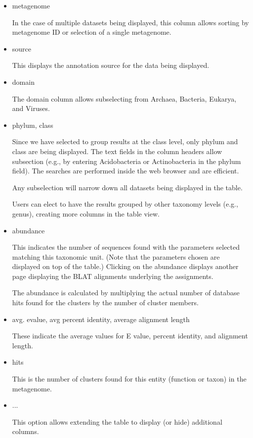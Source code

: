 \documentclass[12pt,fullpage]{report}
\begin{document}
\begin{itemize}
\item metagenome

In the case of multiple datasets being displayed, this column allows sorting by metagenome ID or selection of a single metagenome.

\item source

This displays the annotation source for the data being displayed.

\item domain

The domain column allows subselecting from Archaea, Bacteria, Eukarya, and Viruses.

\item phylum, class

Since we have selected to group results at the class level, only phylum and class are being displayed. The text fields in the column headers
allow subsection (e.g., by entering Acidobacteria or Actinobacteria in the phylum field). The searches are performed inside the web browser and are efficient.

Any subselection will narrow down all datasets being displayed in the table.

Users can elect to have the results grouped by other taxonomy levels (e.g., genus), creating more columns in the table view.

\item abundance

This indicates the number of sequences found with the parameters selected matching this taxonomic unit. (Note that the parameters chosen are displayed on top of the table.) Clicking on the abundance displays another page displaying the BLAT alignments underlying the assignments.

The abundance is calculated by multiplying the actual number of database hits found for the clusters by the number of cluster members.

\item avg. evalue, avg percent identity, average alignment length

These indicate the average values for E  value, percent identity, and alignment length.

\item hits

This is the  number of clusters found for this entity (function or taxon) in the metagenome.

\item ...

This option allows extending the table to display (or hide) additional columns.

\end{itemize}
\end{document}
